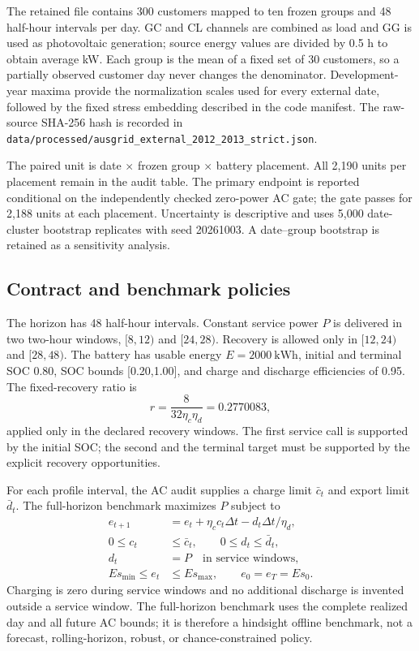 \documentclass[11pt]{article}
\begin{document}
The retained file contains 300 customers mapped to ten frozen groups and 48 half-hour intervals per day. GC and CL channels are combined as load and GG is used as photovoltaic generation; source energy values are divided by 0.5 h to obtain average kW. Each group is the mean of a fixed set of 30 customers, so a partially observed customer day never changes the denominator. Development-year maxima provide the normalization scales used for every external date, followed by the fixed stress embedding described in the code manifest. The raw-source SHA-256 hash is recorded in \texttt{data/processed/ausgrid\_external\_2012\_2013\_strict.json}.

The paired unit is date $\times$ frozen group $\times$ battery placement. All 2,190 units per placement remain in the audit table. The primary endpoint is reported conditional on the independently checked zero-power AC gate; the gate passes for 2,188 units at each placement. Uncertainty is descriptive and uses 5,000 date-cluster bootstrap replicates with seed 20261003. A date--group bootstrap is retained as a sensitivity analysis.

\subsection{Contract and benchmark policies}
The horizon has 48 half-hour intervals. Constant service power $P$ is delivered in two two-hour windows, $[8,12)$ and $[24,28)$. Recovery is allowed only in $[12,24)$ and $[28,48)$. The battery has usable energy $E=2000~\mathrm{kWh}$, initial and terminal SOC 0.80, SOC bounds [0.20,1.00], and charge and discharge efficiencies of 0.95. The fixed-recovery ratio is
\begin{equation}
r=\frac{8}{32\eta_c\eta_d}=0.2770083,
\end{equation}
applied only in the declared recovery windows. The first service call is supported by the initial SOC; the second and the terminal target must be supported by the explicit recovery opportunities.

For each profile interval, the AC audit supplies a charge limit $\bar c_t$ and export limit $\bar d_t$. The full-horizon benchmark maximizes $P$ subject to
\begin{align}
e_{t+1}&=e_t+\eta_c c_t\Delta t-d_t\Delta t/\eta_d,\\
0\le c_t&\le\bar c_t,\qquad 0\le d_t\le\bar d_t,\\
d_t&=P\quad\text{in service windows},\\
E s_{\min}\le e_t&\le E s_{\max},\qquad e_0=e_T=E s_0.
\end{align}
Charging is zero during service windows and no additional discharge is invented outside a service window. The full-horizon benchmark uses the complete realized day and all future AC bounds; it is therefore a hindsight offline benchmark, not a forecast, rolling-horizon, robust, or chance-constrained policy.
\end{document}
